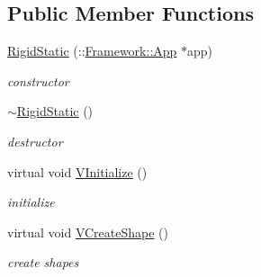 \subsection*{Public Member Functions}
\begin{DoxyCompactItemize}
\item 
\hypertarget{classContent_1_1Actor_1_1RigidStatic_aee1f4fe8db73d3c60bd6d75426ed03e0}{
\hyperlink{classContent_1_1Actor_1_1RigidStatic_aee1f4fe8db73d3c60bd6d75426ed03e0}{RigidStatic} (::\hyperlink{classFramework_1_1App}{Framework::App} $\ast$app)}
\label{classContent_1_1Actor_1_1RigidStatic_aee1f4fe8db73d3c60bd6d75426ed03e0}

\begin{DoxyCompactList}\small\item\em constructor \item\end{DoxyCompactList}\item 
\hypertarget{classContent_1_1Actor_1_1RigidStatic_a5d2807208cc16dd637eaffcfc6109b88}{
\hyperlink{classContent_1_1Actor_1_1RigidStatic_a5d2807208cc16dd637eaffcfc6109b88}{$\sim$RigidStatic} ()}
\label{classContent_1_1Actor_1_1RigidStatic_a5d2807208cc16dd637eaffcfc6109b88}

\begin{DoxyCompactList}\small\item\em destructor \item\end{DoxyCompactList}\item 
\hypertarget{classContent_1_1Actor_1_1RigidStatic_a8e668675a2f2d6afd6bbeca2350b505f}{
virtual void \hyperlink{classContent_1_1Actor_1_1RigidStatic_a8e668675a2f2d6afd6bbeca2350b505f}{VInitialize} ()}
\label{classContent_1_1Actor_1_1RigidStatic_a8e668675a2f2d6afd6bbeca2350b505f}

\begin{DoxyCompactList}\small\item\em initialize \item\end{DoxyCompactList}\item 
\hypertarget{classContent_1_1Actor_1_1RigidStatic_aaea35cb0792298cb6fc4a33fe32ca56d}{
virtual void \hyperlink{classContent_1_1Actor_1_1RigidStatic_aaea35cb0792298cb6fc4a33fe32ca56d}{VCreateShape} ()}
\label{classContent_1_1Actor_1_1RigidStatic_aaea35cb0792298cb6fc4a33fe32ca56d}

\begin{DoxyCompactList}\small\item\em create shapes \item\end{DoxyCompactList}\end{DoxyCompactItemize}



